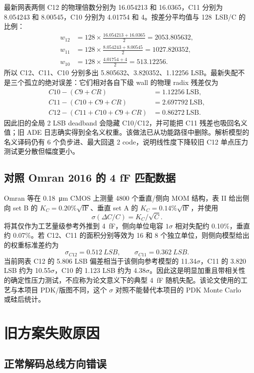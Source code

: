 \documentclass[UTF8,a4paper,11pt]{ctexart}
\begin{document}
最新网表两侧 C12 的物理倍数分别为 16.054213 和 16.0365，C11 分别为 8.054243 和 8.00545，C10 分别为 4.01754 和 4。按差分平均值与 \SI{128}{LSB}/C 的比例：
\begin{align}
w_{12} &= 128\times\frac{16.054213+16.0365}{2}=2053.805632,\\
w_{11} &= 128\times\frac{8.054243+8.00545}{2}=1027.820352,\\
w_{10} &= 128\times\frac{4.01754+4}{2}=513.12256.
\end{align}
所以 C12、C11、C10 分别多出 5.805632、3.820352、1.12256 LSB。最新失配不是三个孤立的绝对误差：它们相对各自下级 wall 的物理 radix 残差仅为
\begin{align}
C10-(C9+CR) &= 1.12256\ \mathrm{LSB},\\
C11-(C10+C9+CR) &= 2.697792\ \mathrm{LSB},\\
C12-(C11+C10+C9+CR) &= 0.86272\ \mathrm{LSB}.
\end{align}
因此旧的全局 2 LSB deadband 会隐藏 C10/C12，并可能把 C11 残差也吸回名义值；旧 ADE 日志确实得到全名义权重。该做法已从功能路径中删除。解析模型的名义译码仍有 6 个负步进、最大回退 2 code，说明线性度下降较旧 C12 单点压力测试更分散但幅度更小。

\subsection{对照 Omran 2016 的 4 fF 匹配数据}

Omran 等在 \SI{0.18}{\micro\metre} CMOS 上测量 4800 个垂直/侧向 MOM 结构，表 II 给出侧向 set B 的 $K_C=0.20\%\sqrt{\mathrm{fF}}$、垂直 set A 的 $K_C=0.14\%\sqrt{\mathrm{fF}}$，并使用
\[
\sigma(\Delta C/C)=K_C/\sqrt{C}.
\]
将其仅作为工艺量级参考外推到 \SI{4}{fF}，侧向单位电容 $1\sigma$ 相对失配约 0.10\%，垂直约 0.07\%。若 C12、C11 的面积分别等效为 16 和 8 个独立单位，则侧向模型给出的权重标准差约为
\[
\sigma_{C12}=\SI{0.512}{LSB},\qquad \sigma_{C11}=\SI{0.362}{LSB}.
\]
当前网表 C12 的 5.806 LSB 偏差相当于该侧向参考模型的 11.34$\sigma$，C11 的 3.820 LSB 约为 10.55$\sigma$，C10 的 1.123 LSB 约为 4.38$\sigma$。因此这是明显加重且带相关性的确定性压力测试，不应称为论文意义下的典型 \SI{4}{fF} 随机失配。该论文使用的工艺与本项目 PDK/版图不同，这个 $\sigma$ 对照不能替代本项目的 PDK Monte Carlo 或硅后统计。

\section{旧方案失败原因}

\subsection{正常解码总线方向错误}
\end{document}
